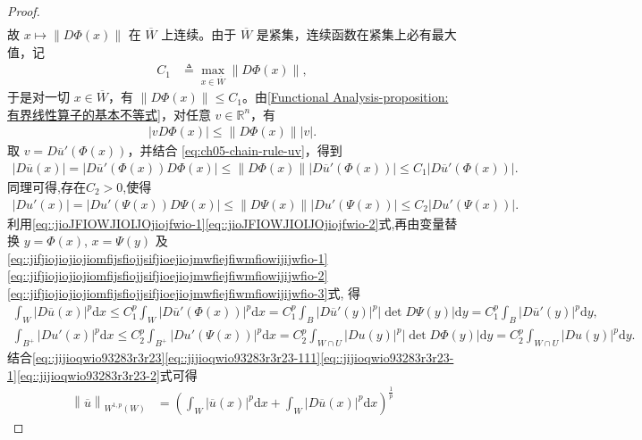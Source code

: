 \documentclass[../../main.tex]{subfiles}%
\begin{document}
\begin{proof}
\begin{align*}
\end{align*}
故 \(x \mapsto \|D\Phi(x)\|\) 在 \(\overline{W}\) 上连续。由于 \(\overline{W}\) 是紧集，连续函数在紧集上必有最大值，记
\begin{align*}
C_1 &\triangleq \max_{x \in \overline{W}} \|D\Phi(x)\|,
\end{align*}
于是对一切 \(x \in \overline{W}\)，有 \(\|D\Phi(x)\| \leqslant C_1\)。由\cref{Functional Analysis-proposition:有界线性算子的基本不等式}，对任意 \(v \in \mathbb{R}^n\)，有
\begin{align*}
|v D\Phi(x)| \leqslant \|D\Phi(x)\| |v|.
\end{align*}
取 \(v = D\overline{u}'(\Phi(x))\)，并结合 \eqref{eq:ch05-chain-rule-uv}，得到
\begin{align}\label{eq::jioJFIOWJIOIJOjiojfwio-1}
|D\overline{u}(x)| = |D\overline{u}'(\Phi(x)) D\Phi(x)| \leqslant \|D\Phi(x)\| |D\overline{u}'(\Phi(x))| \leqslant C_1 |D\overline{u}'(\Phi(x))|.
\end{align}
同理可得,存在$C_2>0$,使得
\begin{align}\label{eq::jioJFIOWJIOIJOjiojfwio-2}
|Du'(x)| = |Du'(\Psi(x)) D\Psi(x)| \leqslant \|D\Psi(x)\| |Du'(\Psi(x))| \leqslant C_2 |Du'(\Psi(x))|.
\end{align}
利用\eqref{eq::jioJFIOWJIOIJOjiojfwio-1}\eqref{eq::jioJFIOWJIOIJOjiojfwio-2}式,再由变量替换 \(y = \Phi(x)\), \(x = \Psi(y)\) 及\eqref{eq::jifjiojiojiojiomfijsfiojjsifjioejiojmwfiejfiwmfiowijijwfio-1}\eqref{eq::jifjiojiojiojiomfijsfiojjsifjioejiojmwfiejfiwmfiowijijwfio-2}\eqref{eq::jifjiojiojiojiomfijsfiojjsifjioejiojmwfiejfiwmfiowijijwfio-3}式, 得
\begin{gather}
\int_W |D\overline{u}(x)|^p \mathrm{d}x \leqslant C_1^p \int_W |D\overline{u}'(\Phi(x))|^p \mathrm{d}x = C_1^p \int_B |D\overline{u}'(y)|^p |\det D\Psi(y)| \mathrm{d}y=C_1^p \int_B |D\overline{u}'(y)|^p \mathrm{d}y,\label{eq::jijioqwio93283r3r23-1}
\\
\int_{B^+}{\left| Du' \left( x \right) \right|^p\mathrm{d}x}\leqslant C_{2}^{p}\int_{B^+}{\left| Du' \left( \Psi \left( x \right) \right) \right|^p\mathrm{d}x}=C_{2}^{p}\int_{W\cap U}{\left| Du \left( y \right) \right|^p |\det D\Phi(y)|\mathrm{d}y}=C_{2}^{p}\int_{W\cap U}{\left| Du \left( y \right) \right|^p \mathrm{d}y}.\label{eq::jijioqwio93283r3r23-2}
\end{gather}
结合\eqref{eq::jijioqwio93283r3r23}\eqref{eq::jijioqwio93283r3r23-111}\eqref{eq::jijioqwio93283r3r23-1}\eqref{eq::jijioqwio93283r3r23-2}式可得
\begin{align}
\left\| \overline{u} \right\| _{W^{1,p}\left( W \right)}&=\left( \int_W{\left| \overline{u}\left( x \right) \right|^p\mathrm{d}x}+\int_W{\left| D\overline{u}\left( x \right) \right|^p\mathrm{d}x} \right) ^{\frac{1}{p}}\nonumber

\end{align}
\end{proof}
\end{document}
